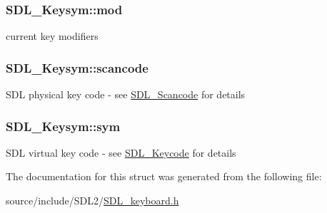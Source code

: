 \subsubsection[{mod}]{ S\+D\+L\+\_\+\+Keysym\+::mod}\label{struct_s_d_l___keysym_ab519d1b8a9939d3d035f7103f3208291}
current key modifiers \hypertarget{struct_s_d_l___keysym_ad47e9120a511e2efc7ec0c6d8a5ec51e}{}
\subsubsection[{scancode}]{ S\+D\+L\+\_\+\+Keysym\+::scancode}\label{struct_s_d_l___keysym_ad47e9120a511e2efc7ec0c6d8a5ec51e}
S\+D\+L physical key code -\/ see \hyperlink{_s_d_l__scancode_8h_a82ab7cff701034fb40a47b5b3a02777b}{S\+D\+L\+\_\+\+Scancode} for details \hypertarget{struct_s_d_l___keysym_a082ff1fd787b79fa6c3a445deb225f08}{}
\subsubsection[{sym}]{ S\+D\+L\+\_\+\+Keysym\+::sym}\label{struct_s_d_l___keysym_a082ff1fd787b79fa6c3a445deb225f08}
S\+D\+L virtual key code -\/ see \hyperlink{_s_d_l__keycode_8h_ae9265f064f13f0f74dfca26a67875171}{S\+D\+L\+\_\+\+Keycode} for details 

The documentation for this struct was generated from the following file\+:\begin{DoxyCompactItemize}
\item 
source/include/\+S\+D\+L2/\hyperlink{_s_d_l__keyboard_8h}{S\+D\+L\+\_\+keyboard.\+h}\end{DoxyCompactItemize}
